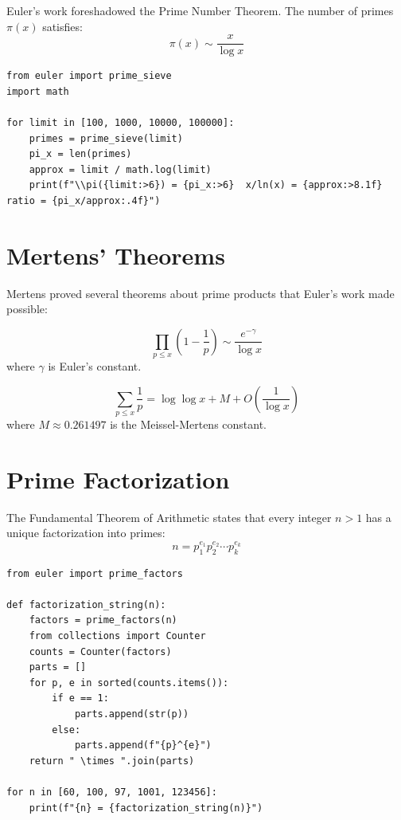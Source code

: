 Euler's work foreshadowed the Prime Number Theorem. The number of primes $\pi(x)$ satisfies:
\[
\pi(x) \sim \frac{x}{\log x}
\]

\begin{lstlisting}[caption={Prime distribution}, label=lst:prime_dist]
from euler import prime_sieve
import math

for limit in [100, 1000, 10000, 100000]:
    primes = prime_sieve(limit)
    pi_x = len(primes)
    approx = limit / math.log(limit)
    print(f"\\pi({limit:>6}) = {pi_x:>6}  x/ln(x) = {approx:>8.1f}  ratio = {pi_x/approx:.4f}")
\end{lstlisting}

\section{Mertens' Theorems}

Mertens proved several theorems about prime products that Euler's work made possible:

\begin{theorem}[Mertens, 1874]
\[
\prod_{p \le x} \left(1 - \frac{1}{p}\right) \sim \frac{e^{-\gamma}}{\log x}
\]
where $\gamma$ is Euler's constant.
\end{theorem}

\begin{theorem}
\[
\sum_{p \le x} \frac{1}{p} = \log \log x + M + O\left(\frac{1}{\log x}\right)
\]
where $M \approx 0.261497$ is the Meissel-Mertens constant.
\end{theorem}

\section{Prime Factorization}

The Fundamental Theorem of Arithmetic states that every integer $n > 1$ has a unique factorization into primes:
\[
n = p_1^{e_1} p_2^{e_2} \cdots p_k^{e_k}
\]

\begin{lstlisting}[caption={Prime factorization}, label=lst:factorization]
from euler import prime_factors

def factorization_string(n):
    factors = prime_factors(n)
    from collections import Counter
    counts = Counter(factors)
    parts = []
    for p, e in sorted(counts.items()):
        if e == 1:
            parts.append(str(p))
        else:
            parts.append(f"{p}^{e}")
    return " \times ".join(parts)

for n in [60, 100, 97, 1001, 123456]:
    print(f"{n} = {factorization_string(n)}")
\end{lstlisting}

